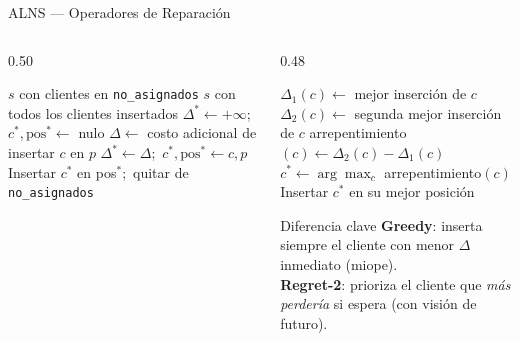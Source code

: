 \documentclass[aspectratio=169,10pt]{beamer}
\begin{document}
\begin{frame}{ALNS --- Operadores de Reparación}
  \begin{columns}[T,onlytextwidth]
    \begin{column}{0.50\textwidth}
      \begin{algorithm}[H]
        \caption{\small \texttt{greedy\_repair}($s$)}
        \begin{algorithmic}[1]\tiny
          \Require $s$ con clientes en \texttt{no\_asignados}
          \Ensure  $s$ con todos los clientes insertados
            \State $\Delta^* \gets +\infty$;\ $c^*, \text{pos}^* \gets$ nulo
                    \State $\Delta \gets$ costo adicional de insertar $c$ en $p$
                      \State $\Delta^* \gets \Delta$;\ $c^*, \text{pos}^* \gets c, p$
                    \EndIf
                  \EndFor
                \EndFor
              \EndFor
            \EndFor
            \State Insertar $c^*$ en pos$^*$;\ quitar de \texttt{no\_asignados}
          \EndWhile
        \end{algorithmic}
      \end{algorithm}
    \end{column}
    \begin{column}{0.48\textwidth}
      \begin{algorithm}[H]
        \caption{\small \texttt{regret2\_repair}($s$)}
        \begin{algorithmic}[1]\tiny
              \State $\Delta_1(c) \gets$ mejor inserción de $c$
              \State $\Delta_2(c) \gets$ segunda mejor inserción de $c$
              \State arrepentimiento$(c) \gets \Delta_2(c) - \Delta_1(c)$
            \EndFor
            \State $c^* \gets \arg\max_c$ arrepentimiento$(c)$
            \State Insertar $c^*$ en su mejor posición
          \EndWhile
        \end{algorithmic}
      \end{algorithm}
      \vspace{0.3em}
      \begin{block}{Diferencia clave}\footnotesize
        \textbf{Greedy}: inserta siempre el cliente con menor $\Delta$ inmediato (miope).\\[0.3em]
        \textbf{Regret-2}: prioriza el cliente que \textit{más perdería} si espera (con visión de futuro).
      \end{block}
    \end{column}
  \end{columns}
\end{frame}
\end{document}
